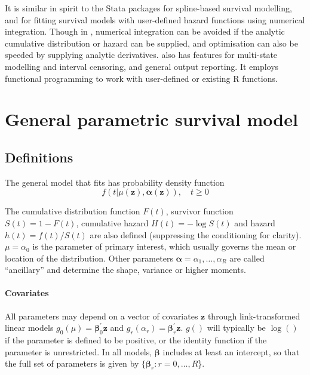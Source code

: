 \documentclass[nojss,nofooter]{jss}
\begin{document}
It is similar in spirit to the Stata packages 
\citep{stpm2} for spline-based survival modelling, and 
\citep{stgenreg} for fitting survival models with user-defined hazard
functions using numerical integration.  Though in ,
numerical integration can be avoided if the analytic cumulative
distribution or hazard can be supplied, and optimisation can also be
speeded by supplying analytic derivatives.   also has
features for multi-state modelling and interval censoring, and general
output reporting.  It employs functional programming to work with
user-defined or existing R functions.



\section{General parametric survival model}

\subsection{Definitions} 

The general model that  fits has probability density function
\begin{equation}
  \label{eq:model}
  f(t | \mu(\mathbf{z}), \bm{\alpha}(\mathbf{z})), \quad t \geq 0  
\end{equation}

The cumulative distribution function $F(t)$, survivor
function $S(t) = 1 - F(t)$, cumulative hazard $H(t) = -\log S(t)$ and
hazard $h(t) = f(t)/S(t)$ are also defined (suppressing the conditioning for clarity).
$\mu=\alpha_0$ is the parameter of primary interest,
which usually governs the mean or location of the distribution.  Other
parameters $\bm{\alpha} = \alpha_1, \ldots, \alpha_R$ are called
``ancillary'' and determine the shape, variance or higher moments.


\paragraph{Covariates} 

All parameters may depend on a vector of covariates $\mathbf{z}$
through link-transformed linear models $g_0(\mu) = \bm{\beta}_0^{'}
\mathbf{z}$ and $g_r(\alpha_r) = \bm{\beta}_r^{'} \mathbf{z}$. $g()$
will typically be $\log()$ if the parameter is defined to be positive,
or the identity function if the parameter is unrestricted.  In all
models, $\bm{\beta}$ includes at least an intercept, so that the full
set of parameters is given by $\{\bm{\beta}_r: r=0,\ldots,R$\}.
\end{document}
